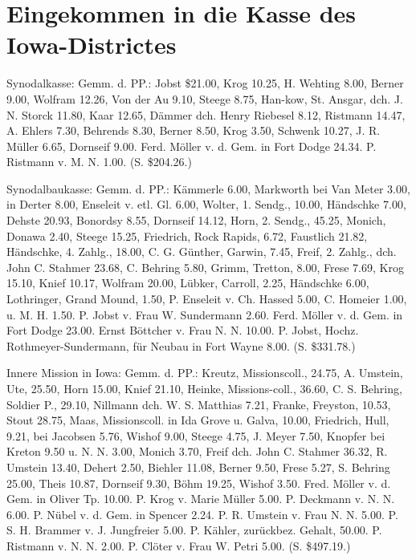 \chapter[Kasse des Iowa-Districtes]{Eingekommen in die Kasse des Iowa-Districtes}

Synodalkasse: Gemm. d. PP.: Jobst \$21.00, Krog 10.25, H. Wehting 8.00, Berner 9.00, Wolfram 12.26, Von der Au 9.10, Steege 8.75, Han-kow, St. Ansgar, dch. J. N. Storck 11.80, Kaar 12.65, Dämmer dch. Henry Riebesel 8.12, Ristmann 14.47, A. Ehlers 7.30, Behrends 8.30, Berner 8.50, Krog 3.50, Schwenk 10.27, J. R. Müller 6.65, Dornseif 9.00. Ferd. Möller v. d. Gem. in Fort Dodge 24.34. P. Ristmann v. M. N. 1.00. (S. \$204.26.)

Synodalbaukasse: Gemm. d. PP.: Kämmerle 6.00, Markworth bei Van Meter 3.00, in Derter 8.00, Enseleit v. etl. Gl. 6.00, Wolter, 1. Sendg., 10.00, Händschke 7.00, Dehste 20.93, Bonordsy 8.55, Dornseif 14.12, Horn, 2. Sendg., 45.25, Monich, Donawa 2.40, Steege 15.25, Friedrich, Rock Rapids, 6.72, Faustlich 21.82, Händschke, 4. Zahlg., 18.00, C. G. Günther, Garwin, 7.45, Freif, 2. Zahlg., dch. John C. Stahmer 23.68, C. Behring 5.80, Grimm, Tretton, 8.00, Frese 7.69, Krog 15.10, Knief 10.17, Wolfram 20.00, Lübker, Carroll, 2.25, Händschke 6.00, Lothringer, Grand Mound, 1.50, P. Enseleit v. Ch. Hassed 5.00, C. Homeier 1.00, u. M. H. 1.50. P. Jobst v. Frau W. Sundermann 2.60. Ferd. Möller v. d. Gem. in Fort Dodge 23.00. Ernst Böttcher v. Frau N. N. 10.00. P. Jobst, Hochz. Rothmeyer-Sundermann, für Neubau in Fort Wayne 8.00. (S. \$331.78.)

Innere Mission in Iowa: Gemm. d. PP.: Kreutz, Missionscoll., 24.75, A. Umstein, Ute, 25.50, Horn 15.00, Knief 21.10, Heinke, Missions-coll., 36.60, C. S. Behring, Soldier P., 29.10, Nillmann dch. W. S. Matthias 7.21, Franke, Freyston, 10.53, Stout 28.75, Maas, Missionscoll. in Ida Grove u. Galva, 10.00, Friedrich, Hull, 9.21, bei Jacobsen 5.76, Wishof 9.00, Steege 4.75, J. Meyer 7.50, Knopfer bei Kreton 9.50 u. N. N. 3.00, Monich 3.70, Freif dch. John C. Stahmer 36.32, R. Umstein 13.40, Dehert 2.50, Biehler 11.08, Berner 9.50, Frese 5.27, S. Behring 25.00, Theis 10.87, Dornseif 9.30, Böhm 19.25, Wishof 3.50. Fred. Möller v. d. Gem. in Oliver Tp. 10.00. P. Krog v. Marie Müller 5.00. P. Deckmann v. N. N. 6.00. P. Nübel v. d. Gem. in Spencer 2.24. P. R. Umstein v. Frau N. N. 5.00. P. S. H. Brammer v. J. Jungfreier 5.00. P. Kähler, zurückbez. Gehalt, 50.00. P. Ristmann v. N. N. 2.00. P. Clöter v. Frau W. Petri 5.00. (S. \$497.19.)

